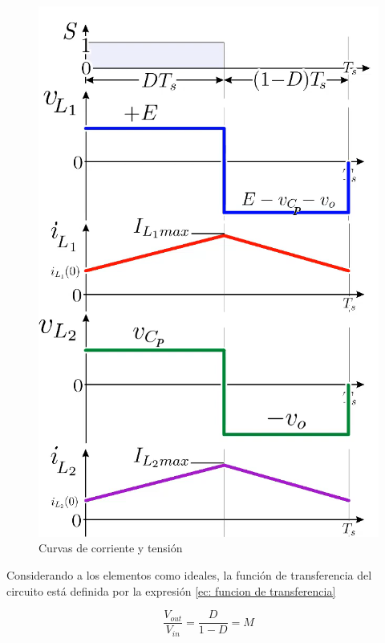      \begin{figure}[htbp]
            \centering
             \includegraphics[scale = 0.25]{Figuras/curvas_BB.png}
            \caption{Curvas de corriente y tensión}
            \label{fig: Circuito sepic}
      \end{figure}
  
    Considerando a los elementos como ideales, la función de transferencia del circuito está definida por la expresión \ref{ec: funcion de transferencia}
    
    \begin{equation}
        \frac{V_{out}}{V_{in}} = \frac{D}{1-D} = M 
        \label{ec: funcion de transferencia}
    \end{equation}
    

